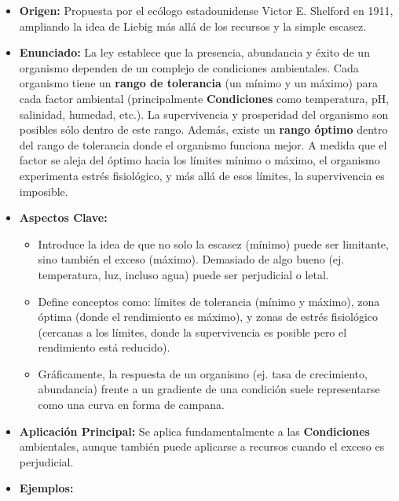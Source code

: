 \documentclass[
]{book}
\providecommand{\tightlist}{%
  \setlength{\itemsep}{0pt}\setlength{\parskip}{0pt}}
\begin{document}
\begin{itemize}
\tightlist
\item
  \textbf{Origen:} Propuesta por el ecólogo estadounidense Victor E. Shelford en 1911, ampliando la idea de Liebig más allá de los recursos y la simple escasez.
\item
  \textbf{Enunciado:} La ley establece que la presencia, abundancia y éxito de un organismo dependen de un complejo de condiciones ambientales. Cada organismo tiene un \textbf{rango de tolerancia} (un mínimo y un máximo) para cada factor ambiental (principalmente \textbf{Condiciones} como temperatura, pH, salinidad, humedad, etc.). La supervivencia y prosperidad del organismo son posibles sólo dentro de este rango. Además, existe un \textbf{rango óptimo} dentro del rango de tolerancia donde el organismo funciona mejor. A medida que el factor se aleja del óptimo hacia los límites mínimo o máximo, el organismo experimenta estrés fisiológico, y más allá de esos límites, la supervivencia es imposible.
\item
  \textbf{Aspectos Clave:}

  \begin{itemize}
  \tightlist
  \item
    Introduce la idea de que no solo la escasez (mínimo) puede ser limitante, sino también el exceso (máximo). Demasiado de algo bueno (ej. temperatura, luz, incluso agua) puede ser perjudicial o letal.
  \item
    Define conceptos como: límites de tolerancia (mínimo y máximo), zona óptima (donde el rendimiento es máximo), y zonas de estrés fisiológico (cercanas a los límites, donde la supervivencia es posible pero el rendimiento está reducido).
  \item
    Gráficamente, la respuesta de un organismo (ej. tasa de crecimiento, abundancia) frente a un gradiente de una condición suele representarse como una curva en forma de campana.
  \end{itemize}
\item
  \textbf{Aplicación Principal:} Se aplica fundamentalmente a las \textbf{Condiciones} ambientales, aunque también puede aplicarse a recursos cuando el exceso es perjudicial.
\item
  \textbf{Ejemplos:}


\end{itemize}
\end{document}
